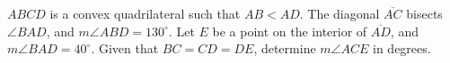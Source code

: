 $ABCD$ is a convex quadrilateral such that $AB<AD$.  The diagonal $\overline{AC}$ bisects $\angle BAD$, and $m\angle ABD=130^\circ$.  Let $E$ be a point on the interior of $\overline{AD}$, and $m\angle BAD=40^\circ$.  Given that $BC=CD=DE$, determine $m\angle ACE$ in degrees.